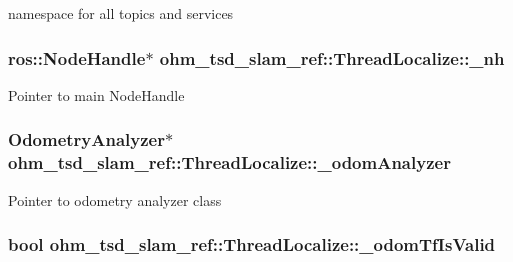namespace for all topics and services \hypertarget{classohm__tsd__slam__ref_1_1ThreadLocalize_a339ec43d3843e2049120afd424a636f7}{
\subsubsection[{\-\_\-nh}]{\setlength{\rightskip}{0pt plus 5cm}ros\-::\-Node\-Handle$\ast$ ohm\-\_\-tsd\-\_\-slam\-\_\-ref\-::\-Thread\-Localize\-::\-\_\-nh\hspace{0.3cm}{\ttfamily [private]}}}\label{classohm__tsd__slam__ref_1_1ThreadLocalize_a339ec43d3843e2049120afd424a636f7}
Pointer to main Node\-Handle \hypertarget{classohm__tsd__slam__ref_1_1ThreadLocalize_a719b8e1a97ec5ba8e859f24b416699a0}{
\subsubsection[{\-\_\-odom\-Analyzer}]{\setlength{\rightskip}{0pt plus 5cm}Odometry\-Analyzer$\ast$ ohm\-\_\-tsd\-\_\-slam\-\_\-ref\-::\-Thread\-Localize\-::\-\_\-odom\-Analyzer\hspace{0.3cm}{\ttfamily [private]}}}\label{classohm__tsd__slam__ref_1_1ThreadLocalize_a719b8e1a97ec5ba8e859f24b416699a0}
Pointer to odometry analyzer class \hypertarget{classohm__tsd__slam__ref_1_1ThreadLocalize_a60894678d5815e42124c78eef219cf8b}{
\subsubsection[{\-\_\-odom\-Tf\-Is\-Valid}]{\setlength{\rightskip}{0pt plus 5cm}bool ohm\-\_\-tsd\-\_\-slam\-\_\-ref\-::\-Thread\-Localize\-::\-\_\-odom\-Tf\-Is\-Valid\hspace{0.3cm}{\ttfamily [private]}}}\label{classohm__tsd__slam__ref_1_1ThreadLocalize_a60894678d5815e42124c78eef219cf8b}
